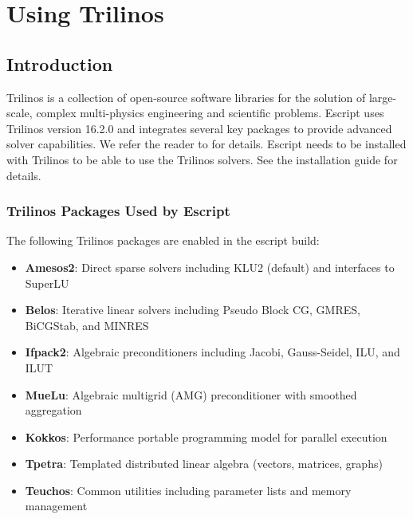 
%
%
%

\chapter{Using Trilinos}
\label{TRILINOS}

\section{Introduction}
Trilinos is a collection of open-source software libraries for the solution of large-scale, complex multi-physics engineering and scientific problems.
Escript uses Trilinos version 16.2.0 and integrates several key packages to provide advanced solver capabilities.
We refer the reader to \cite{TrilinosWeb} for details.  Escript needs to be installed with Trilinos to be able to use the Trilinos solvers.
See the installation guide for details.

\subsection{Trilinos Packages Used by Escript}
The following Trilinos packages are enabled in the escript build:
\begin{itemize}
\item \textbf{Amesos2}: Direct sparse solvers including KLU2 (default) and interfaces to SuperLU
\item \textbf{Belos}: Iterative linear solvers including Pseudo Block CG, GMRES, BiCGStab, and MINRES
\item \textbf{Ifpack2}: Algebraic preconditioners including Jacobi, Gauss-Seidel, ILU, and ILUT
\item \textbf{MueLu}: Algebraic multigrid (AMG) preconditioner with smoothed aggregation
\item \textbf{Kokkos}: Performance portable programming model for parallel execution
\item \textbf{Tpetra}: Templated distributed linear algebra (vectors, matrices, graphs)
\item \textbf{Teuchos}: Common utilities including parameter lists and memory management
\end{itemize}

